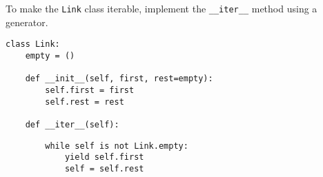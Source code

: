 \question To make the \lstinline$Link$ class iterable, implement the
\lstinline$__iter__$ method using a generator.

\begin{lstlisting}
class Link:
    empty = ()

    def __init__(self, first, rest=empty):
        self.first = first
        self.rest = rest

    def __iter__(self):
\end{lstlisting}

\begin{solution}[.75in]
\begin{lstlisting}
        while self is not Link.empty:
            yield self.first
            self = self.rest
\end{lstlisting}
\end{solution}
